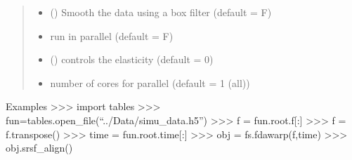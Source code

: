 \documentclass[letterpaper,10pt,english]{sphinxmanual}
\begin{document}
\begin{fulllineitems}
\begin{fulllineitems}
\begin{quote}
\begin{description}
\begin{itemize}
\item {} 
 () \textendash{} Smooth the data using a box filter (default = F)

\item {} 
 \textendash{} run in parallel (default = F)

\item {} 
 () \textendash{} controls the elasticity (default = 0)

\item {} 
 \textendash{} number of cores for parallel (default = \sphinxhyphen{}1 (all))

\end{itemize}

\end{description}\end{quote}

Examples
\textgreater{}\textgreater{}\textgreater{} import tables
\textgreater{}\textgreater{}\textgreater{} fun=tables.open\_file(“../Data/simu\_data.h5”)
\textgreater{}\textgreater{}\textgreater{} f = fun.root.f{[}:{]}
\textgreater{}\textgreater{}\textgreater{} f = f.transpose()
\textgreater{}\textgreater{}\textgreater{} time = fun.root.time{[}:{]}
\textgreater{}\textgreater{}\textgreater{} obj = fs.fdawarp(f,time)
\textgreater{}\textgreater{}\textgreater{} obj.srsf\_align()

\end{fulllineitems}


\end{fulllineitems}

\end{document}
